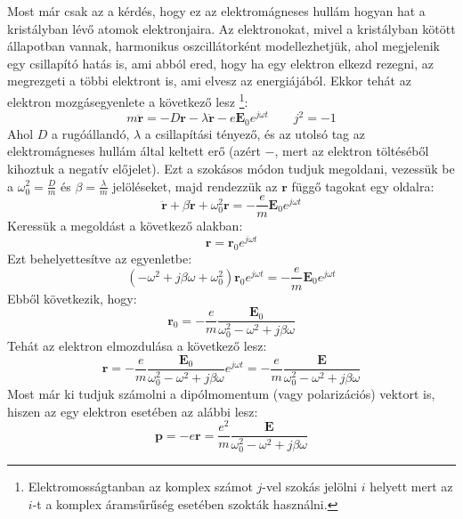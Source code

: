 \documentclass[../main.tex]{subfiles}
\begin{document}
Most már csak az a kérdés, hogy ez az elektromágneses hullám hogyan hat a kristályban lévő atomok elektronjaira. Az elektronokat, mivel a kristályban kötött állapotban vannak, harmonikus oszcillátorként modellezhetjük,
ahol megjelenik egy csillapító hatás is, ami abból ered, hogy ha egy elektron elkezd rezegni, az megrezgeti a többi elektront is, ami elvesz az energiájából. Ekkor tehát az elektron mozgásegyenlete a következő lesz
\footnote{
    Elektromosságtanban az komplex számot $j$-vel szokás jelölni $i$ helyett mert az $i$-t a komplex áramsűrűség esetében szokták használni.
}:
\begin{equation}
    m \ddot{\mathbf{r}} = -D \mathbf{r} - \lambda \dot{\mathbf{r}} - e \mathbf{E}_0 e^{j \omega t} \qquad j^2 = -1
\end{equation}
Ahol $D$ a rugóállandó, $\lambda$ a csillapítási tényező, és az utolsó tag az elektromágneses hullám által keltett erő (azért $-$, mert az elektron töltéséből kihoztuk a negatív előjelet).
Ezt a szokásos módon tudjuk megoldani, vezessük be a $\omega_0^2 = \frac{D}{m}$ és $\beta = \frac{\lambda}{m}$ jelöléseket, majd rendezzük az $\mathbf{r}$ függő tagokat egy oldalra:
\begin{equation}
    \ddot{\mathbf{r}} + \beta \dot{\mathbf{r}} + \omega_0^2 \mathbf{r} = -\frac{e}{m} \mathbf{E}_0 e^{j \omega t}
\end{equation}
Keressük a megoldást a következő alakban:
\begin{equation}
    \mathbf{r} = \mathbf{r}_0 e^{j \omega t}
\end{equation}
Ezt behelyettesítve az egyenletbe:
\begin{equation}
    (-\omega^2 + j \beta \omega + \omega_0^2) \mathbf{r}_0 e^{j \omega t} = -\frac{e}{m} \mathbf{E}_0 e^{j \omega t}
\end{equation}
Ebből következik, hogy:
\begin{equation}
    \mathbf{r}_0 = - \frac{e}{m} \frac{\mathbf{E}_0}{\omega_0^2 - \omega^2 + j \beta \omega} 
\end{equation}
Tehát az elektron elmozdulása a következő lesz:
\begin{equation}
    \mathbf{r} = - \frac{e}{m} \frac{\mathbf{E}_0}{\omega_0^2 - \omega^2 + j \beta \omega} e^{j \omega t} = - \frac{e}{m} \frac{\mathbf{E}}{\omega_0^2 - \omega^2 + j \beta \omega}
\end{equation}
Most már ki tudjuk számolni a dipólmomentum (vagy polarizációs) vektort is, hiszen az egy elektron esetében az alábbi lesz:
\begin{equation}
    \mathbf{p} = - e \mathbf{r} = \frac{e^2}{m} \frac{\mathbf{E}}{\omega_0^2 - \omega^2 + j \beta \omega}
\end{equation}
\end{document}
